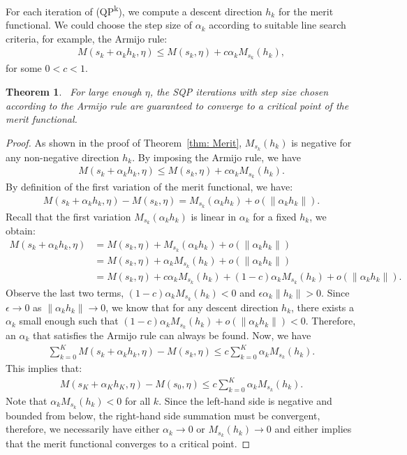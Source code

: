 \documentclass[12pt,leqno]{amsart}
\newtheorem{theorem}{Theorem}
\begin{document}
For each iteration of (QP\textsuperscript{k}), we compute a descent direction $h_k$ for the merit functional. We could choose the step size of $\alpha_k$ according to suitable line search criteria, for example, the Armijo rule:
\begin{align*}
    M(s_k+\alpha_k h_k,\eta)\leq M(s_k,\eta)+c\alpha_k M_{s_k}(h_k),
\end{align*}
for some $0<c<1$.
\begin{theorem}~\label{thm: global-convergence} 
 For large enough $\eta$, the SQP iterations with step size chosen according to the Armijo rule are guaranteed to converge to a critical point of the merit functional.
\end{theorem}
\begin{proof}
    As shown in the proof of Theorem~\ref{thm: Merit}, $M_{s_k}(h_k)$ is negative for any non-negative direction $h_k$. By imposing the Armijo rule, we have
    \begin{align*}
         M(s_k+\alpha_k h_k,\eta)\leq M(s_k,\eta)+c\alpha_k M_{s_k}(h_k).
    \end{align*}  
    By definition of the first variation of the merit functional, we have: 
    \begin{align*}
         M(s_k+\alpha_k h_k,\eta)-M(s_k,\eta) = M_{s_k}(\alpha_k h_k)+o(\|\alpha_k h_k\|).
    \end{align*}
    Recall that the first variation $M_{s_k}(\alpha_k h_k)$ is linear in $\alpha_k$ for a fixed $h_k$, we obtain:
    \begin{align*}
        M(s_k+\alpha_k h_k,\eta)
        &= M(s_k,\eta) + M_{s_k}(\alpha_k h_k)+o(\|\alpha_k h_k\|)\\
        &= M(s_k,\eta) + \alpha_kM_{s_k}(h_k)+o(\|\alpha_k h_k\|)\\
        &= M(s_k,\eta) + c \alpha_kM_{s_k}(h_k)+ (1-c) \alpha_kM_{s_k}(h_k)+o(\|\alpha_k h_k\|).
    \end{align*}
    Observe the last two terms, $(1-c) \alpha_kM_{s_k}(h_k)<0$ and $\epsilon \alpha_k \|h_k\|>0$. Since $\epsilon\rightarrow 0$ as $\|\alpha_k h_k\|\rightarrow 0$, we know that for any descent direction $h_k$, there exists a $\alpha_k$ small enough such that $(1-c) \alpha_kM_{s_k}(h_k)+o(\|\alpha_k h_k\|)<0$. Therefore, an $\alpha_k$ that satisfies the Armijo rule can always be found.
    Now, we have
    \begin{align*}
        \sum_{k=0}^{K} M(s_k+\alpha_k h_k,\eta)- M(s_k,\eta) \leq c \sum_{k=0}^{K}\alpha_kM_{s_k}(h_k).
    \end{align*}
    This implies that:
    \begin{align*}
        M(s_K+\alpha_K h_K,\eta)-M(s_0,\eta)\leq c \sum_{k=0}^{K}\alpha_k M_{s_k}(h_k).
    \end{align*}
    Note that $\alpha_k M_{s_k}(h_k)< 0$ for all $k$. Since the left-hand side is negative and bounded from below, the right-hand side summation must be convergent, therefore, we necessarily have either $\alpha_k \rightarrow 0$ or $M_{s_k}(h_k) \rightarrow 0$ and either implies that the merit functional converges to a critical point.
\end{proof}
\end{document}
